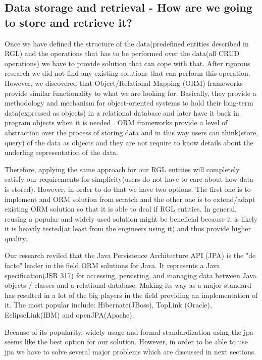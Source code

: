 \documentclass[a4paper, notitlepage]{article}
\begin{document}
\subsection{Data storage and retrieval - How are we going to store and retrieve it? }

Once we have defined the structure of the data(predefined entities described in RGL) and the operations that has to be performed over the data(all CRUD operations) we have to provide solution that can cope with that. After rigorous research we did not find any existing solutions that can perform this operation. However, we discovered that Object/Relational Mapping (ORM) frameworks provide similar functionality to what we are looking for. Basically, they provide a methodology and mechanism for object-oriented systems to hold their long-term data(expressed as objects) in a relational database and later have it back in program objects when it is needed \cite{Neil}. ORM frameworks provide a level of abstraction over the process of storing data and in this way users can think(store, query) of the data as objects and they are not require to know details about the underling representation of the data. 

Therefore, applying the same approach for our RGL entities will completely satisfy our requirements for simplicity(users do not have to care about how data is stored). However, in order to do that we have two options. The first one is to implement and ORM solution from scratch and the other one is to extend/adapt existing ORM solution so that it is able to deal if RGL entities. In general, reusing a popular and widely used solution might be beneficial because it is likely it is heavily tested(at least from the engineers using it) and thus provide higher quality. 

Our research reviled that the Java Persistence Architecture API (JPA) is the "de facto" leader in the field ORM solutions for Java. It represents a Java specification(JSR 317) for accessing, persisting, and managing data between Java objects / classes and a relational database. Making its way as a major standard has resulted in a lot of the big players in the field providing an implementation of it. The most popular include: Hibernate(JBoss), TopLink (Oracle), EclipseLink(IBM) and openJPA(Apache). 

Because of its popularity, widely usage and formal standardization using the jpa  seems like the best option for our solution. However, in order to be able to use jpa we have to solve several major problems which are discussed in next sections.
\end{document}
